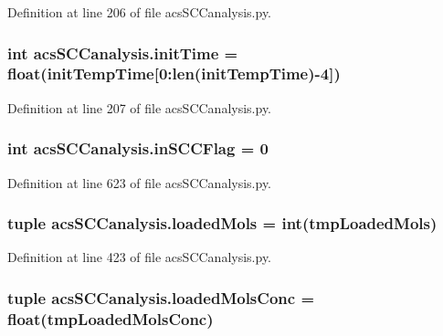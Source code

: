 Definition at line 206 of file acs\-S\-C\-Canalysis.\-py.

\hypertarget{a00097_a826c1b0585b4e8474c76f92bd7583836}{
\subsubsection[{init\-Time}]{\setlength{\rightskip}{0pt plus 5cm}int acs\-S\-C\-Canalysis.\-init\-Time = float({\bf init\-Temp\-Time}\mbox{[}0\-:len({\bf init\-Temp\-Time})-\/4\mbox{]})}}\label{a00097_a826c1b0585b4e8474c76f92bd7583836}


Definition at line 207 of file acs\-S\-C\-Canalysis.\-py.

\hypertarget{a00097_a6405b6b05e7b87812422cc30d2034904}{
\subsubsection[{in\-S\-C\-C\-Flag}]{\setlength{\rightskip}{0pt plus 5cm}int acs\-S\-C\-Canalysis.\-in\-S\-C\-C\-Flag = 0}}\label{a00097_a6405b6b05e7b87812422cc30d2034904}


Definition at line 623 of file acs\-S\-C\-Canalysis.\-py.

\hypertarget{a00097_ab4566d46d368eb4f93ff6db5191648bd}{
\subsubsection[{loaded\-Mols}]{\setlength{\rightskip}{0pt plus 5cm}tuple acs\-S\-C\-Canalysis.\-loaded\-Mols = int(tmp\-Loaded\-Mols)}}\label{a00097_ab4566d46d368eb4f93ff6db5191648bd}


Definition at line 423 of file acs\-S\-C\-Canalysis.\-py.

\hypertarget{a00097_abe83f5e0ae3bd65da15a697a979aeea1}{
\subsubsection[{loaded\-Mols\-Conc}]{\setlength{\rightskip}{0pt plus 5cm}tuple acs\-S\-C\-Canalysis.\-loaded\-Mols\-Conc = float(tmp\-Loaded\-Mols\-Conc)}}\label{a00097_abe83f5e0ae3bd65da15a697a979aeea1}


